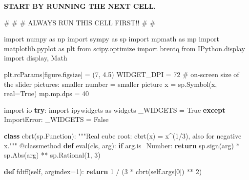 \documentclass[
  letterpaper,
  DIV=11,
  numbers=noendperiod]{scrreprt}
\newenvironment{Shaded}{\begin{snugshade}}{\end{snugshade}}
\newcommand{\AttributeTok}[1]{\textcolor[rgb]{0.40,0.45,0.13}{#1}}
\newcommand{\BuiltInTok}[1]{\textcolor[rgb]{0.00,0.23,0.31}{#1}}
\newcommand{\CommentTok}[1]{\textcolor[rgb]{0.37,0.37,0.37}{#1}}
\newcommand{\ControlFlowTok}[1]{\textcolor[rgb]{0.00,0.23,0.31}{\textbf{#1}}}
\newcommand{\DecValTok}[1]{\textcolor[rgb]{0.68,0.00,0.00}{#1}}
\newcommand{\FloatTok}[1]{\textcolor[rgb]{0.68,0.00,0.00}{#1}}
\newcommand{\ImportTok}[1]{\textcolor[rgb]{0.00,0.46,0.62}{#1}}
\newcommand{\KeywordTok}[1]{\textcolor[rgb]{0.00,0.23,0.31}{\textbf{#1}}}
\newcommand{\NormalTok}[1]{\textcolor[rgb]{0.00,0.23,0.31}{#1}}
\newcommand{\OperatorTok}[1]{\textcolor[rgb]{0.37,0.37,0.37}{#1}}
\newcommand{\PreprocessorTok}[1]{\textcolor[rgb]{0.68,0.00,0.00}{#1}}
\newcommand{\StringTok}[1]{\textcolor[rgb]{0.13,0.47,0.30}{#1}}
\newcommand{\VariableTok}[1]{\textcolor[rgb]{0.07,0.07,0.07}{#1}}
\theoremstyle{plain}
\theoremstyle{plain}
\theoremstyle{definition}
\theoremstyle{definition}
\theoremstyle{definition}
\theoremstyle{plain}
\theoremstyle{plain}
\theoremstyle{remark}
\begin{document}
\textbf{START BY RUNNING THE NEXT CELL.}

\begin{Shaded}
\begin{Highlighting}[]
\CommentTok{\#}
\CommentTok{\#}
\CommentTok{\# ALWAYS RUN THIS CELL FIRST!!}
\CommentTok{\#}
\CommentTok{\#}

\ImportTok{import}\NormalTok{ numpy }\ImportTok{as}\NormalTok{ np}
\ImportTok{import}\NormalTok{ sympy }\ImportTok{as}\NormalTok{ sp}
\ImportTok{import}\NormalTok{ mpmath }\ImportTok{as}\NormalTok{ mp}
\ImportTok{import}\NormalTok{ matplotlib.pyplot }\ImportTok{as}\NormalTok{ plt}
\ImportTok{from}\NormalTok{ scipy.optimize }\ImportTok{import}\NormalTok{ brentq}
\ImportTok{from}\NormalTok{ IPython.display }\ImportTok{import}\NormalTok{ display, Math}

\NormalTok{plt.rcParams[}\StringTok{\textquotesingle{}figure.figsize\textquotesingle{}}\NormalTok{] }\OperatorTok{=}\NormalTok{ (}\DecValTok{7}\NormalTok{, }\FloatTok{4.5}\NormalTok{)}
\NormalTok{WIDGET\_DPI }\OperatorTok{=} \DecValTok{72}          \CommentTok{\# on{-}screen size of the slider pictures: smaller number = smaller picture}
\NormalTok{x }\OperatorTok{=}\NormalTok{ sp.Symbol(}\StringTok{\textquotesingle{}x\textquotesingle{}}\NormalTok{, real}\OperatorTok{=}\VariableTok{True}\NormalTok{)}
\NormalTok{mp.mp.dps }\OperatorTok{=} \DecValTok{40}

\ImportTok{import}\NormalTok{ io}
\ControlFlowTok{try}\NormalTok{:}
    \ImportTok{import}\NormalTok{ ipywidgets }\ImportTok{as}\NormalTok{ widgets}
\NormalTok{    \_WIDGETS }\OperatorTok{=} \VariableTok{True}
\ControlFlowTok{except} \PreprocessorTok{ImportError}\NormalTok{:}
\NormalTok{    \_WIDGETS }\OperatorTok{=} \VariableTok{False}


\KeywordTok{class}\NormalTok{ cbrt(sp.Function):}
    \CommentTok{"""Real cube root: cbrt(x) = x\^{}(1/3), also for negative x."""}
    \AttributeTok{@classmethod}
    \KeywordTok{def} \BuiltInTok{eval}\NormalTok{(cls, arg):}
        \ControlFlowTok{if}\NormalTok{ arg.is\_Number:}
            \ControlFlowTok{return}\NormalTok{ sp.sign(arg) }\OperatorTok{*}\NormalTok{ sp.Abs(arg) }\OperatorTok{**}\NormalTok{ sp.Rational(}\DecValTok{1}\NormalTok{, }\DecValTok{3}\NormalTok{)}

    \KeywordTok{def}\NormalTok{ fdiff(}\VariableTok{self}\NormalTok{, argindex}\OperatorTok{=}\DecValTok{1}\NormalTok{):}
        \ControlFlowTok{return} \DecValTok{1} \OperatorTok{/}\NormalTok{ (}\DecValTok{3} \OperatorTok{*}\NormalTok{ cbrt(}\VariableTok{self}\NormalTok{.args[}\DecValTok{0}\NormalTok{]) }\OperatorTok{**} \DecValTok{2}\NormalTok{)}


\end{Highlighting}
\end{Shaded}
\end{document}
